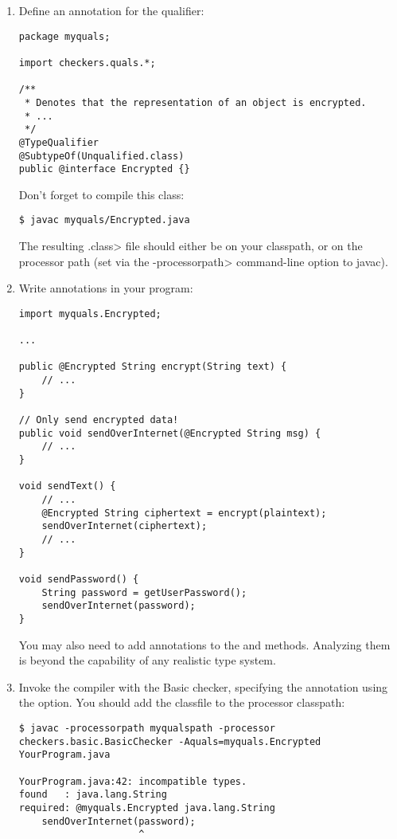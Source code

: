 \begin{enumerate}
\item
 Define an annotation for the  qualifier:

\begin{Verbatim}
package myquals;

import checkers.quals.*;

/**
 * Denotes that the representation of an object is encrypted.
 * ...
 */
@TypeQualifier
@SubtypeOf(Unqualified.class)
public @interface Encrypted {}
\end{Verbatim}

Don't forget to compile this class:

\begin{Verbatim}
$ javac myquals/Encrypted.java
\end{Verbatim}

The resulting \<.class> file should either be on your classpath, or on the
processor path (set via the \<-processorpath> command-line option to javac).

\item 
  Write  annotations in your program:

\begin{Verbatim}
import myquals.Encrypted;

...

public @Encrypted String encrypt(String text) {
    // ...
}

// Only send encrypted data!
public void sendOverInternet(@Encrypted String msg) {
    // ...
}

void sendText() {
    // ...
    @Encrypted String ciphertext = encrypt(plaintext);
    sendOverInternet(ciphertext);
    // ...
}

void sendPassword() {
    String password = getUserPassword();
    sendOverInternet(password);
}
\end{Verbatim}

You may also need to add  annotations to the
 and  methods.  Analyzing them is beyond the
capability of any realistic type system.

\item
  Invoke the compiler with the Basic checker, specifying the
   annotation using the  option.
  You should add the  classfile to the processor classpath:

\begin{Verbatim}
$ javac -processorpath myqualspath -processor checkers.basic.BasicChecker -Aquals=myquals.Encrypted YourProgram.java

YourProgram.java:42: incompatible types.
found   : java.lang.String
required: @myquals.Encrypted java.lang.String
    sendOverInternet(password);
                     ^
\end{Verbatim}

\end{enumerate}


